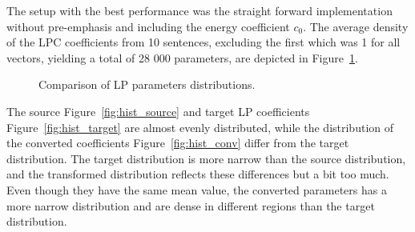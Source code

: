 The setup with the best performance was the straight forward implementation without pre-emphasis and including the energy coefficient $c_0$. The average density of the LPC coefficients from 10 sentences, excluding the first which was 1 for all vectors, yielding a total of 28 000 parameters, are depicted in Figure~\ref{fig:hist_lp}.
\begin{figure}[htbp]
	\begin{center}
	\caption{Comparison of LP parameters distributions.}
	\label{fig:hist_lp}
	\end{center}
\end{figure}
The source Figure~\ref{fig:hist_source} and target LP coefficients Figure~\ref{fig:hist_target} are almost evenly distributed, while the distribution of the converted coefficients Figure~\ref{fig:hist_conv} differ from the target distribution. The target distribution is more narrow than the source distribution, and the transformed distribution reflects these differences but a bit too much. Even though they have the same mean value, the converted parameters has a more narrow distribution and are dense in different regions than the target distribution.

